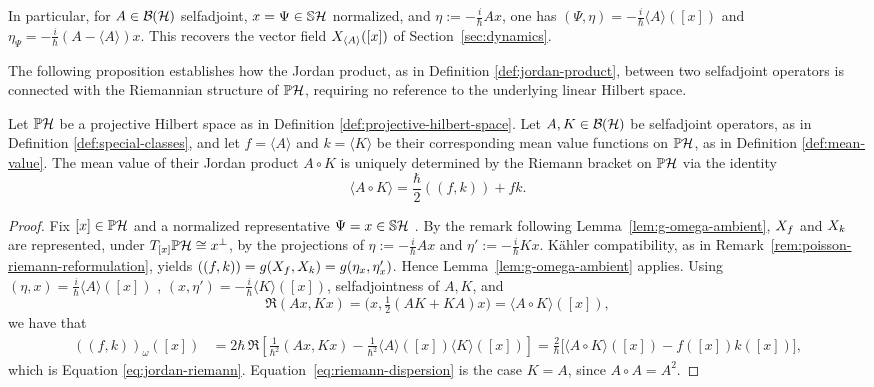 \begin{remark}
	In particular, for $A\in\BH$ selfadjoint, $x=\Psi \in \mathbb{S}\H$ normalized, and $\eta:=-\frac i\hbar Ax$, one has $(\Psi,\eta)=-\frac i\hbar\langle A\rangle([x])$ and $\eta_\Psi=-\frac i\hbar(A-\langle A\rangle)x$. This recovers the vector field $X_{\langle A\rangle}([x])$ of Section~\ref{sec:dynamics}.
\end{remark}

\noindent The following proposition establishes how the Jordan product, as in Definition \ref{def:jordan-product}, between two selfadjoint operators is connected with the Riemannian structure of $\PH$, requiring no reference to the underlying linear Hilbert space.

\begin{proposition}
	\label{prop:symmetric-bracket-intrinsic}
	Let $\PH$ be a projective Hilbert space as in Definition \ref{def:projective-hilbert-space}. Let $A,K\in\BH$ be selfadjoint operators, as in Definition \ref{def:special-classes}, and let $f = \langle A\rangle$ and $k = \langle K\rangle$ be their corresponding mean value functions on $\PH$, as in Definition \ref{def:mean-value}. The mean value of their Jordan product $A \circ K$ is uniquely determined by the Riemann bracket on $\PH$ via the identity
	\begin{equation}
		\langle A \circ K \rangle = \frac{\hbar}{2}((f,k)) +fk. \label{eq:jordan-riemann}
	\end{equation}
\end{proposition}
\begin{proof}
	Fix $[x]\in\PH$ and a normalized representative $\Psi=x \in \mathbb{S} \H$ . By the remark following Lemma~\ref{lem:g-omega-ambient}, $X_{f}$ and $X_{k}$ are
	represented, under $T_{[x]}\PH\cong x^\perp$, by the projections of
	$\eta:=-\frac i\hbar Ax$ and $\eta':=-\frac i\hbar Kx$. Kähler
	compatibility, as in Remark~\ref{rem:poisson-riemann-reformulation}, yields
	$((f,k))=g(X_{f},X_{k})=g(\eta_x,\eta'_x)$. Hence
	Lemma~\ref{lem:g-omega-ambient} applies. Using $(\eta,x)=\frac i\hbar\langle A\rangle([x])$ , $(x,\eta')=-\frac i\hbar\langle K\rangle([x])$, 
	selfadjointness of $A,K$, and $$\Re(Ax,Kx)=\big(x,\tfrac12(AK+KA)x\big)
	=\langle A\circ K\rangle([x]),$$
	we have that
	\begin{align*}
		((f,k))_\omega([x]) &= 2\hbar\,\Re\left[\frac1{\hbar^2}(Ax,Kx)-\frac{1}{\hbar^2}\langle A\rangle([x])\langle K\rangle([x])\right]
		=\frac2\hbar\big[\langle A\circ K\rangle([x])-f([x])k([x])\big],
	\end{align*}
	which is Equation \eqref{eq:jordan-riemann}. Equation~\eqref{eq:riemann-dispersion}
	is the case $K=A$, since $A\circ A=A^2$.
\end{proof}

